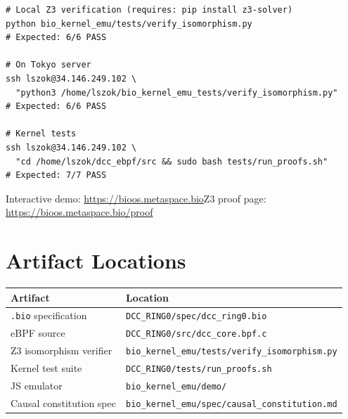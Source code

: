 \documentclass[11pt,a4paper,twoside]{article}
\newcommand{\bioURL}{\url{https://bioos.metaspace.bio}}
\newcommand{\proofURL}{\url{https://bioos.metaspace.bio/proof}}
\begin{document}
\begin{lstlisting}[style=shellstyle]
# Local Z3 verification (requires: pip install z3-solver)
python bio_kernel_emu/tests/verify_isomorphism.py
# Expected: 6/6 PASS

# On Tokyo server
ssh lszok@34.146.249.102 \
  "python3 /home/lszok/bio_kernel_emu_tests/verify_isomorphism.py"
# Expected: 6/6 PASS

# Kernel tests
ssh lszok@34.146.249.102 \
  "cd /home/lszok/dcc_ebpf/src && sudo bash tests/run_proofs.sh"
# Expected: 7/7 PASS
\end{lstlisting}

Interactive demo: \bioURL\quad Z3 proof page: \proofURL

\section{Artifact Locations}

\begin{tabular}{@{}ll@{}}
\toprule
\textbf{Artifact} & \textbf{Location} \\ \midrule
\texttt{.bio} specification   & \texttt{DCC\_RING0/spec/dcc\_ring0.bio} \\
eBPF source                   & \texttt{DCC\_RING0/src/dcc\_core.bpf.c} \\
Z3 isomorphism verifier       & \texttt{bio\_kernel\_emu/tests/verify\_isomorphism.py} \\
Kernel test suite             & \texttt{DCC\_RING0/tests/run\_proofs.sh} \\
JS emulator                   & \texttt{bio\_kernel\_emu/demo/} \\
Causal constitution spec      & \texttt{bio\_kernel\_emu/spec/causal\_constitution.md} \\
\bottomrule
\end{tabular}

\newpage
\end{document}
